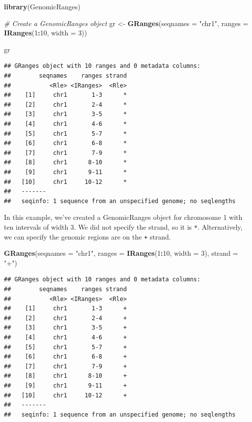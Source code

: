 \documentclass[
]{book}
\newenvironment{Shaded}{\begin{snugshade}}{\end{snugshade}}
\newcommand{\AttributeTok}[1]{\textcolor[rgb]{0.13,0.29,0.53}{#1}}
\newcommand{\CommentTok}[1]{\textcolor[rgb]{0.56,0.35,0.01}{\textit{#1}}}
\newcommand{\DecValTok}[1]{\textcolor[rgb]{0.00,0.00,0.81}{#1}}
\newcommand{\FunctionTok}[1]{\textcolor[rgb]{0.13,0.29,0.53}{\textbf{#1}}}
\newcommand{\NormalTok}[1]{#1}
\newcommand{\OtherTok}[1]{\textcolor[rgb]{0.56,0.35,0.01}{#1}}
\newcommand{\SpecialCharTok}[1]{\textcolor[rgb]{0.81,0.36,0.00}{\textbf{#1}}}
\newcommand{\StringTok}[1]{\textcolor[rgb]{0.31,0.60,0.02}{#1}}
\begin{document}
\begin{Shaded}
\begin{Highlighting}[]
\FunctionTok{library}\NormalTok{(GenomicRanges)}

\CommentTok{\# Create a GenomicRanges object}
\NormalTok{gr }\OtherTok{\textless{}{-}} \FunctionTok{GRanges}\NormalTok{(}\AttributeTok{seqnames =} \StringTok{"chr1"}\NormalTok{, }
              \AttributeTok{ranges =} \FunctionTok{IRanges}\NormalTok{(}\DecValTok{1}\SpecialCharTok{:}\DecValTok{10}\NormalTok{, }\AttributeTok{width =} \DecValTok{3}\NormalTok{))}

\NormalTok{gr}
\end{Highlighting}
\end{Shaded}

\begin{verbatim}
## GRanges object with 10 ranges and 0 metadata columns:
##        seqnames    ranges strand
##           <Rle> <IRanges>  <Rle>
##    [1]     chr1       1-3      *
##    [2]     chr1       2-4      *
##    [3]     chr1       3-5      *
##    [4]     chr1       4-6      *
##    [5]     chr1       5-7      *
##    [6]     chr1       6-8      *
##    [7]     chr1       7-9      *
##    [8]     chr1      8-10      *
##    [9]     chr1      9-11      *
##   [10]     chr1     10-12      *
##   -------
##   seqinfo: 1 sequence from an unspecified genome; no seqlengths
\end{verbatim}

In this example, we've created a GenomicRanges object for chromosome 1 with ten intervals of width 3. We did not specify the strand, so it is \texttt{*}. Alternatively, we can
specify the genomic regions are on the \texttt{+} strand.

\begin{Shaded}
\begin{Highlighting}[]
\FunctionTok{GRanges}\NormalTok{(}\AttributeTok{seqnames =} \StringTok{"chr1"}\NormalTok{, }
        \AttributeTok{ranges =} \FunctionTok{IRanges}\NormalTok{(}\DecValTok{1}\SpecialCharTok{:}\DecValTok{10}\NormalTok{, }\AttributeTok{width =} \DecValTok{3}\NormalTok{),}
        \AttributeTok{strand =} \StringTok{"+"}\NormalTok{)}
\end{Highlighting}
\end{Shaded}

\begin{verbatim}
## GRanges object with 10 ranges and 0 metadata columns:
##        seqnames    ranges strand
##           <Rle> <IRanges>  <Rle>
##    [1]     chr1       1-3      +
##    [2]     chr1       2-4      +
##    [3]     chr1       3-5      +
##    [4]     chr1       4-6      +
##    [5]     chr1       5-7      +
##    [6]     chr1       6-8      +
##    [7]     chr1       7-9      +
##    [8]     chr1      8-10      +
##    [9]     chr1      9-11      +
##   [10]     chr1     10-12      +
##   -------
##   seqinfo: 1 sequence from an unspecified genome; no seqlengths
\end{verbatim}
\end{document}
